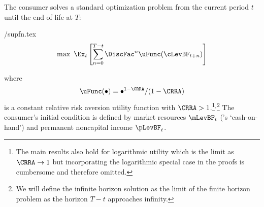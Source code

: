 \documentclass[BufferStockTheory]{subfiles}
\begin{document}
The consumer solves a standard optimization problem from the current period $t$ until the end of life at $T$: 
\begin{verbatimwrite}{\EqDir/supfn.tex}
  \begin{align*}%
    \max~ \Ex_{t}\left[\sum_{n=0}^{T-t} \DiscFac^{n} \uFunc(\cLevBF_{t+n})\right]
  \end{align*}
\end{verbatimwrite}

where
\begin{align}
  \uFunc(\bullet)=\bullet^{1-\CRRA}/(1-\CRRA) \label{eq:crrautil}
\end{align}
is a constant relative risk aversion utility function with $\CRRA > 1$.\footnote{The main
  results also hold for logarithmic utility which is the limit as
  $\CRRA \rightarrow 1$ but incorporating the logarithmic special case
  in the proofs is cumbersome and therefore
  omitted.}$^{,}$\footnote{We will define the infinite horizon
  solution as the limit of the finite horizon problem as the horizon
  $T-t$ approaches infinity.}  The consumer's initial condition is
defined by market resources $\mLevBF_{t}$ (\cite{deatonLiqConstr}'s
`cash-on-hand') and permanent noncapital income $\pLevBF_{t}$.
\end{document}
